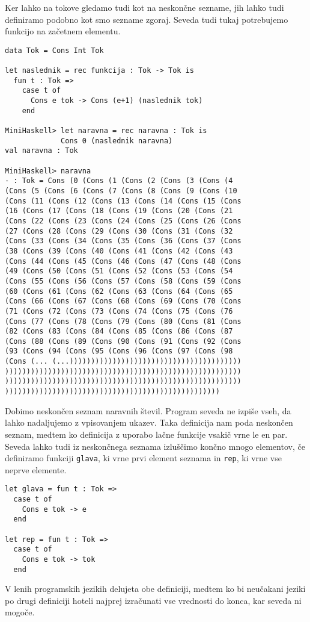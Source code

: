 \documentclass[12pt,a4paper,openany]{book}
\begin{document}
Ker lahko na tokove gledamo tudi kot na neskončne sezname, jih lahko tudi definiramo podobno kot smo sezname zgoraj. Seveda tudi tukaj 
potrebujemo funkcijo na začetnem elementu.
\begin{lstlisting}
data Tok = Cons Int Tok

let naslednik = rec funkcija : Tok -> Tok is
  fun t : Tok =>
    case t of
      Cons e tok -> Cons (e+1) (naslednik tok)
    end

MiniHaskell> let naravna = rec naravna : Tok is
             Cons 0 (naslednik naravna)
val naravna : Tok

MiniHaskell> naravna
- : Tok = Cons (0 (Cons (1 (Cons (2 (Cons (3 (Cons (4 
(Cons (5 (Cons (6 (Cons (7 (Cons (8 (Cons (9 (Cons (10 
(Cons (11 (Cons (12 (Cons (13 (Cons (14 (Cons (15 (Cons 
(16 (Cons (17 (Cons (18 (Cons (19 (Cons (20 (Cons (21 
(Cons (22 (Cons (23 (Cons (24 (Cons (25 (Cons (26 (Cons 
(27 (Cons (28 (Cons (29 (Cons (30 (Cons (31 (Cons (32 
(Cons (33 (Cons (34 (Cons (35 (Cons (36 (Cons (37 (Cons 
(38 (Cons (39 (Cons (40 (Cons (41 (Cons (42 (Cons (43 
(Cons (44 (Cons (45 (Cons (46 (Cons (47 (Cons (48 (Cons 
(49 (Cons (50 (Cons (51 (Cons (52 (Cons (53 (Cons (54 
(Cons (55 (Cons (56 (Cons (57 (Cons (58 (Cons (59 (Cons 
(60 (Cons (61 (Cons (62 (Cons (63 (Cons (64 (Cons (65 
(Cons (66 (Cons (67 (Cons (68 (Cons (69 (Cons (70 (Cons 
(71 (Cons (72 (Cons (73 (Cons (74 (Cons (75 (Cons (76 
(Cons (77 (Cons (78 (Cons (79 (Cons (80 (Cons (81 (Cons 
(82 (Cons (83 (Cons (84 (Cons (85 (Cons (86 (Cons (87 
(Cons (88 (Cons (89 (Cons (90 (Cons (91 (Cons (92 (Cons 
(93 (Cons (94 (Cons (95 (Cons (96 (Cons (97 (Cons (98 
(Cons (... (...))))))))))))))))))))))))))))))))))))))))
)))))))))))))))))))))))))))))))))))))))))))))))))))))))
)))))))))))))))))))))))))))))))))))))))))))))))))))))))
))))))))))))))))))))))))))))))))))))))))))))))))))
\end{lstlisting}
Dobimo neskončen seznam naravnih števil. Program seveda ne izpiše vseh, da lahko nadaljujemo z vpisovanjem ukazev. 
Taka definicija nam poda neskončen seznam, medtem ko definicija z uporabo lačne funkcije vsakič vrne le en par. 
Seveda lahko tudi iz neskončnega seznama izluščimo končno mnogo elementov, če definiramo funkciji \lstinline{glava}, 
ki vrne prvi element seznama in \lstinline{rep}, ki vrne vse neprve elemente. 
\begin{lstlisting}
let glava = fun t : Tok =>
  case t of 
    Cons e tok -> e
  end

let rep = fun t : Tok =>
  case t of 
    Cons e tok -> tok
  end
\end{lstlisting}
V lenih programskih jezikih delujeta obe definiciji, medtem ko 
bi neučakani jeziki po drugi definiciji hoteli najprej izračunati vse vrednosti do konca, kar seveda ni mogoče.  
\end{document}
